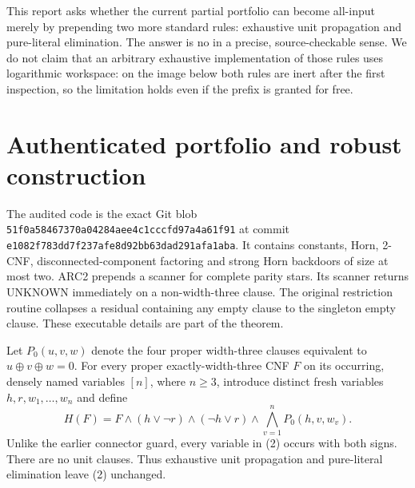 \documentclass[11pt]{article}
\begin{document}
This report asks whether the current partial portfolio can become
all-input merely by prepending two more standard rules: exhaustive unit
propagation and pure-literal elimination. The answer is no in a precise,
source-checkable sense. We do not claim that an arbitrary exhaustive
implementation of those rules uses logarithmic workspace: on the image
below both rules are inert after the first inspection, so the limitation
holds even if the prefix is granted for free.

\section{Authenticated portfolio and robust construction}
The audited code is the exact Git blob
\nolinkurl{51f0a58467370a04284aee4c1cccfd97a4a61f91} at commit
\nolinkurl{e1082f783dd7f237afe8d92bb63dad291afa1aba}. It contains constants,
Horn, 2-CNF, disconnected-component factoring and strong Horn backdoors
of size at most two. ARC2 prepends a scanner for complete parity stars.
Its scanner returns UNKNOWN immediately on a non-width-three clause.
The original restriction routine collapses a residual containing any
empty clause to the singleton empty clause. These executable details are
part of the theorem.

Let $P_0(u,v,w)$ denote the four proper width-three clauses equivalent to
$u\oplus v\oplus w=0$. For every proper exactly-width-three CNF $F$ on
its occurring, densely named variables $[n]$, where $n\geq3$, introduce
distinct fresh variables $h,r,w_1,\ldots,w_n$ and define
\[
 H(F)=F\wedge(h\vee\neg r)\wedge(\neg h\vee r)
 \wedge\bigwedge_{v=1}^{n}P_0(h,v,w_v).
 \tag{2}
\]
Unlike the earlier connector guard, every variable in (2) occurs with
both signs. There are no unit clauses. Thus exhaustive unit propagation
and pure-literal elimination leave (2) unchanged.
\end{document}
